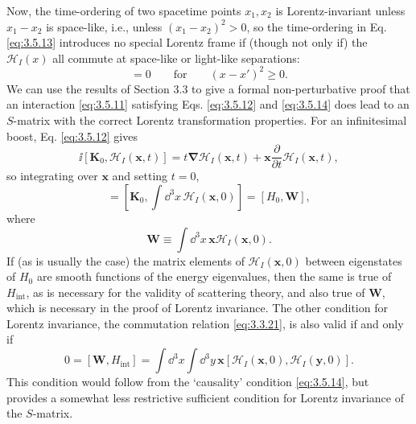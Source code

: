 Now, the time-ordering of two spacetime points $x_1,x_2$ is Lorentz-invariant unless $x_1-x_2$
is space-like, i.e., unless $(x_1-x_2)^2>0$, so the time-ordering in Eq. \eqref{eq:3.5.13} introduces
no special Lorentz frame if (though not only if) the $\mathcal{H}_I(x)$ all commute at space-like
or light-like separations:
\begin{equation}
 [\mathcal{H}_I(x),\mathcal{H}_I(x')]=0\qquad\text{for}\qquad(x-x')^2\geq0.
 \tag{3.5.14}\label{eq:3.5.14}
\end{equation}
We can use the results of Section 3.3 to give a formal non-perturbative proof that an interaction
\eqref{eq:3.5.11} satisfying Eqs. \eqref{eq:3.5.12} and \eqref{eq:3.5.14} does lead to an $S$-matrix with the correct
Lorentz transformation properties. For an infinitesimal boost, Eq. \eqref{eq:3.5.12} gives
\begin{equation}
 \ii[\mathbf{K}_0,\mathcal{H}_I(\mathbf{x},t)]
 =t\boldsymbol{\nabla}\mathcal{H}_I(\mathbf{x},t)
 +\mathbf{x}\frac{\partial}{\partial t}\mathcal{H}_I(\mathbf{x},t),
 \tag{3.5.15}\label{eq:3.5.15}
\end{equation}
so integrating over $\mathbf{x}$ and setting $t=0$,
\begin{equation}
 [\mathbf{K}_0,H_{\mathrm{int}}]
 =\left[\mathbf{K}_0,\int \dd^3x\,\mathcal{H}_I(\mathbf{x},0)\right]
 =[H_0,\mathbf{W}],
 \tag{3.5.16}\label{eq:3.5.16}
\end{equation}
where
\begin{equation}
 \mathbf{W}\equiv\int \dd^3x\,\mathbf{x}\mathcal{H}_I(\mathbf{x},0).
 \tag{3.5.17}\label{eq:3.5.17}
\end{equation}
If (as is usually the case) the matrix elements of $\mathcal{H}_I(\mathbf{x},0)$ between
eigenstates of $H_0$ are smooth functions of the energy eigenvalues, then the same is true of
$H_{\mathrm{int}}$, as is necessary for the validity of scattering theory, and also true of
$\mathbf{W}$, which is necessary in the proof of Lorentz invariance. The other condition for
Lorentz invariance, the commutation relation \eqref{eq:3.3.21}, is also valid if and only if
\begin{equation}
 0=[\mathbf{W},H_{\mathrm{int}}]
 =\int \dd^3x\int \dd^3y\,\mathbf{x}
 [\mathcal{H}_I(\mathbf{x},0),\mathcal{H}_I(\mathbf{y},0)].
 \tag{3.5.18}\label{eq:3.5.18}
\end{equation}
This condition would follow from the `causality' condition \eqref{eq:3.5.14}, but provides a somewhat
less restrictive sufficient condition for Lorentz invariance of the $S$-matrix.

